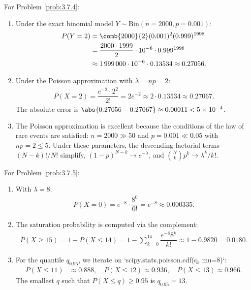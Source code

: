 \begin{solucion}
	\label{sol:3.7.4}
	For Problem \ref{prob:3.7.4}:
	\begin{enumerate}
		\item Under the exact binomial model $Y \sim \text{Bin}(n = 2000, p = 0.001)$:
		\begin{align*}
			P(Y = 2) &= \comb{2000}{2}(0.001)^{2}(0.999)^{1998} \\
			&= \dfrac{2000 \cdot 1999}{2} \cdot 10^{-6} \cdot 0.999^{1998} \\
			&\approx 1\,999\,000 \cdot 10^{-6} \cdot 0.13534 \approx 0.27056.
		\end{align*}
		\item Under the Poisson approximation with $\lambda = np = 2$:
		\begin{align*}
			P(X = 2) = \dfrac{e^{-2} \cdot 2^{2}}{2!} = 2 e^{-2} \approx 2 \cdot 0.13534 \approx 0.27067.
		\end{align*}
		The absolute error is $\abs{0.27056 - 0.27067} \approx 0.00011 < 5 \times 10^{-4}$.
		\item The Poisson approximation is excellent because the conditions of the law of rare events are satisfied: $n = 2000 \gg 50$ and $p = 0.001 \ll 0.05$ with $np = 2 \le 5$. Under these parameters, the descending factorial terms $(N-k)!/N!$ simplify, $(1-p)^{N-k} \to e^{-\lambda}$, and $\binom{N}{k} p^{k} \to \lambda^{k}/k!$.
	\end{enumerate}
\end{solucion}

\begin{solucion}
	\label{sol:3.7.5}
	For Problem \ref{prob:3.7.5}:
	\begin{enumerate}
		\item With $\lambda = 8$:
		\begin{align*}
			P(X = 0) = e^{-8} \cdot \dfrac{8^{0}}{0!} = e^{-8} \approx 0.000335.
		\end{align*}
		\item The saturation probability is computed via the complement:
		\begin{align*}
			P(X \ge 15) = 1 - P(X \le 14) = 1 - \sum_{k=0}^{14} \dfrac{e^{-8} 8^{k}}{k!} \approx 1 - 0.9820 = 0.0180.
		\end{align*}
		\item For the quantile $q_{0.95}$, we iterate on `scipy.stats.poisson.cdf(q, mu=8)`:
		\begin{align*}
			P(X \le 11) &\approx 0.888, \quad P(X \le 12) \approx 0.936, \quad P(X \le 13) \approx 0.966.
		\end{align*}
		The smallest $q$ such that $P(X \le q) \ge 0.95$ is $q_{0.95} = 13$.
	\end{enumerate}
\end{solucion}

